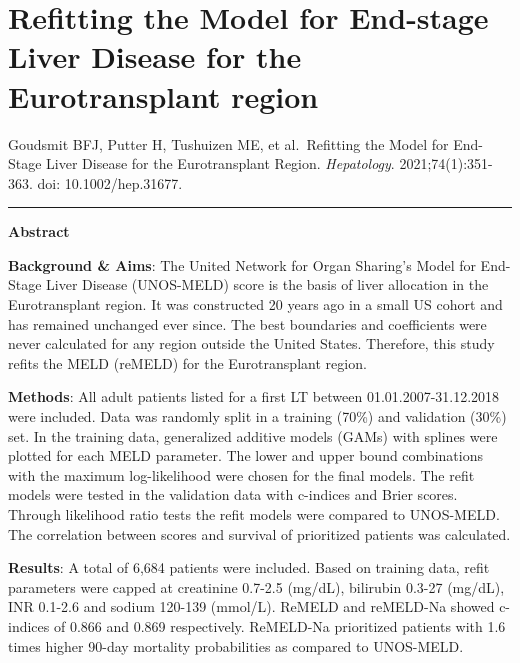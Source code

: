 \documentclass[11pt,english,]{book} %
\begin{document}
\newpage
\linespread{1.213}
\normalsize
\thispagestyle{plain}

\mbox{}

\pagecolor{black}
\color{white}

\hypertarget{chap-refit}{%
\chapter{Refitting the Model for End-stage Liver Disease for the Eurotransplant region}\label{chap-refit}}


\vspace*{\fill}

\noindent Goudsmit BFJ, Putter H, Tushuizen ME, et al.~Refitting the Model for End-Stage Liver Disease for the Eurotransplant Region. \emph{Hepatology}. 2021;74(1):351-363. doi: 10.1002/hep.31677.

\begin{center}\rule{0.5\linewidth}{0.5pt}\end{center}

\newpage

\noindent
\nopagecolor
\color{black}
\small

\textbf{Abstract}

\textbf{Background \& Aims}: The United Network for Organ Sharing's Model for End- Stage Liver Disease (UNOS-MELD) score is the basis of liver allocation in the Eurotransplant region. It was constructed 20 years ago in a small US cohort and has remained unchanged ever since. The best boundaries and coefficients were never calculated for any region outside the United States. Therefore, this study refits the MELD (reMELD) for the Eurotransplant region.

\textbf{Methods}: All adult patients listed for a first LT between 01.01.2007-31.12.2018 were included. Data was randomly split in a training (70\%) and validation (30\%) set. In the training data, generalized additive models (GAMs) with splines were plotted for each MELD parameter. The lower and upper bound combinations with the maximum log-likelihood were chosen for the final models. The refit models were tested in the validation data with c-indices and Brier scores. Through likelihood ratio tests the refit models were compared to UNOS-MELD. The correlation between scores and survival of prioritized patients was calculated.

\textbf{Results}: A total of 6,684 patients were included. Based on training data, refit parameters were capped at creatinine 0.7-2.5 (mg/dL), bilirubin 0.3-27 (mg/dL), INR 0.1-2.6 and sodium 120-139 (mmol/L). ReMELD and reMELD-Na showed c-indices of 0.866 and 0.869 respectively. ReMELD-Na prioritized patients with 1.6 times higher 90-day mortality probabilities as compared to UNOS-MELD.
\end{document}
